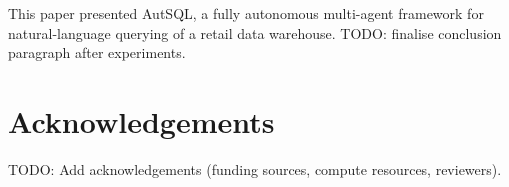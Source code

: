 \documentclass[conference]{IEEEtran}
\begin{document}


This paper presented AutSQL, a fully autonomous multi-agent framework
for natural-language querying of a retail data warehouse.
TODO: finalise conclusion paragraph after experiments.

\section*{Acknowledgements}
TODO: Add acknowledgements (funding sources, compute resources, reviewers).



\end{document}

